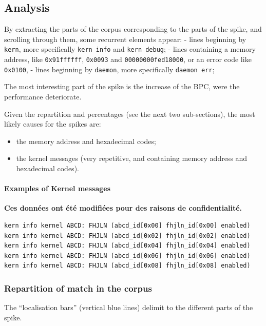 \subsection{Analysis}

By extracting the parts of the corpus corresponding to the parts of the
spike, and scrolling through them, some recurrent elements appear: -
lines beginning by \lstinline!kern!, more specifically
\lstinline!kern info! and \lstinline!kern debug!; - lines containing a
memory address, like \lstinline!0x91ffffff!, \lstinline!0x0093! and
\lstinline!00000000fed18000!, or an error code like \lstinline!0x0100!,
- lines beginning by \lstinline!daemon!, more specifically
\lstinline!daemon err!;

The most interesting part of the spike is the increase of the BPC, were
the performance deteriorate.

Given the repartition and percentages (see the next two sub-sections),
the most likely causes for the spikes are:
\begin{itemize}
\item the memory address and
hexadecimal codes;
\item the kernel messages (very repetitive, and
containing memory address and hexadecimal codes).
\end{itemize}

\paragraph{Examples of Kernel
messages}

\textbf{Ces données ont été modifiées pour des raisons de confidentialité.}
\begin{lstlisting}
kern info kernel ABCD: FHJLN (abcd_id[0x00] fhjln_id[0x00] enabled)
kern info kernel ABCD: FHJLN (abcd_id[0x02] fhjln_id[0x02] enabled)
kern info kernel ABCD: FHJLN (abcd_id[0x04] fhjln_id[0x04] enabled)
kern info kernel ABCD: FHJLN (abcd_id[0x06] fhjln_id[0x06] enabled)
kern info kernel ABCD: FHJLN (abcd_id[0x08] fhjln_id[0x08] enabled)
\end{lstlisting}

\subsubsection{Repartition of match in the
corpus}

The ``localisation bars'' (vertical blue lines) delimit to the different
parts of the spike.


